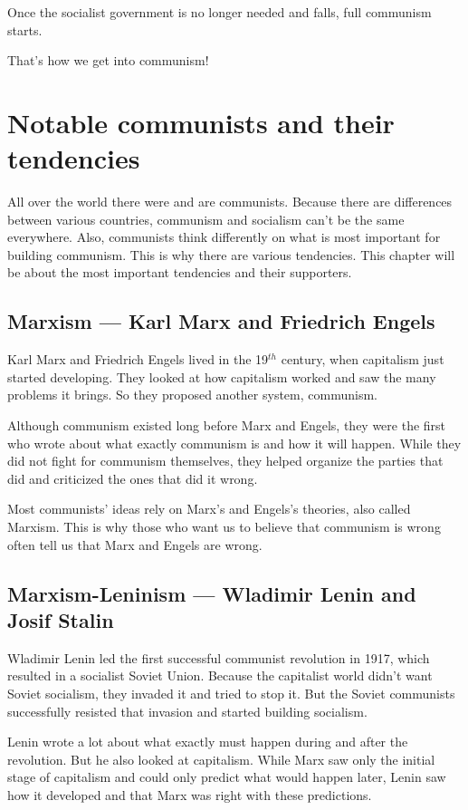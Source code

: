 \documentclass[a4paper]{book}%
\begin{document}
Once the socialist government is no longer needed and falls, full communism starts.

That's how we get into communism!

\chapter{Notable communists and their tendencies}

All over the world there were and are communists. Because there are differences between various countries, communism and socialism can't be the same everywhere. Also, communists think differently on what is most important for building communism. This is why there are various tendencies. This chapter will be about the most important tendencies and their supporters.

\section{Marxism --- Karl Marx and Friedrich Engels}

Karl Marx and Friedrich Engels lived in the 19$^{th}$ century, when capitalism just started developing. They looked at how capitalism worked and saw the many problems it brings. So they proposed another system, communism.

Although communism existed long before Marx and Engels, they were the first who wrote about what exactly communism is and how it will happen. While they did not fight for communism themselves, they helped organize the parties that did and criticized the ones that did it wrong.

Most communists' ideas rely on Marx's and Engels's theories, also called Marxism. This is why those who want us to believe that communism is wrong often tell us that Marx and Engels are wrong.

\section{Marxism-Leninism --- Wladimir Lenin and Josif Stalin}

Wladimir Lenin led the first successful communist revolution in 1917, which resulted in a socialist Soviet Union. Because the capitalist world didn't want Soviet socialism, they invaded it and tried to stop it. But the Soviet communists successfully resisted that invasion and started building socialism.

Lenin wrote a lot about what exactly must happen during and after the revolution. But he also looked at capitalism. While Marx saw only the initial stage of capitalism and could only predict what would happen later, Lenin saw how it developed and that Marx was right with these predictions.
\end{document}
